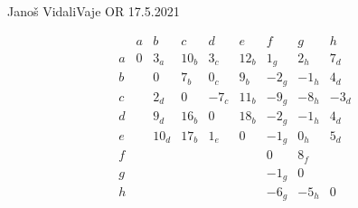 \begin{naloga}{Janoš Vidali}{Vaje OR 17.5.2021}
\begin{odgovor}
\begin{tabela}
$$
\begin{array}{c|cccccccc}
& a & b & c & d & e & f & g & h \\ \hline
a & 0 & 3_a & 10_b & 3_c & 12_b &  1_g &  2_h &  7_d \\
b & & 0 & 7_b & 0_c & 9_b & -2_g & -1_h &  4_d \\
c & & 2_d & 0 & -7_c & 11_b & -9_g & -8_h & -3_d \\
d & & 9_d & 16_b & 0 & 18_b & -2_g & -1_h & 4_d \\
e & & 10_d & 17_b & 1_e & 0 & -1_g &  0_h & 5_d \\
f & & & & & & 0 & 8_f & \\
g & & & & & & -1_g & 0 & \\
h & & & & & & -6_g & -5_h & 0 \\
\end{array}
$$
\end{tabela}

\end{odgovor}
\end{naloga}

